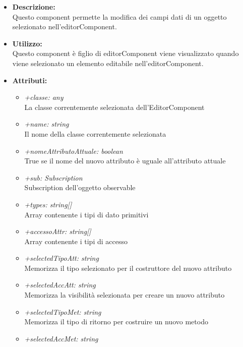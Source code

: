 				\begin{itemize}
          			\item \textbf{Descrizione:}\\
          			Questo component permette la modifica dei campi dati di un oggetto selezionato nell’editorComponent.
          			\item \textbf{Utilizzo:}\\
          			Questo component è figlio di editorComponent viene visualizzato quando viene selezionato un elemento editabile nell’editorComponent.
          			\item \textbf{Attributi:}\\
          			\begin{itemize}
          				\item \emph{+classe: any}\\
            			La classe correntemente selezionata dell'EditorComponent
            			\item \emph{+name: string}\\
            			Il nome della classe correntemente selezionata
            			\item \emph{+nomeAttributoAttuale: boolean}\\
            			True se il nome del nuovo attributo è uguale all'attributo attuale
            			\item \emph{+sub: Subscription}\\
            			Subscription dell'oggetto observable
            			\item \emph{+types: string[]}\\
            			Array contenente i tipi di dato primitivi
            			\item \emph{+accessoAttr: string[]}\\
            			Array contenente i tipi di accesso
            			\item \emph{+selectedTipoAtt: string}\\
            			Memorizza il tipo selezionato per il costruttore del nuovo attributo
            			\item \emph{+selectedAccAtt: string}\\
            			Memorizza la visibilità selezionata per creare un nuovo attributo
            			\item \emph{+selectedTipoMet: string}\\
            			Memorizza il tipo di ritorno per costruire un nuovo metodo
            			\item \emph{+selectedAccMet: string}\\

\end{itemize}
\end{itemize}
